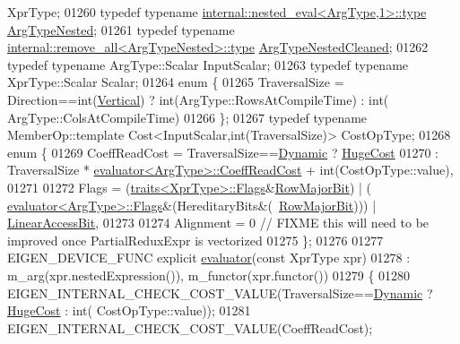 \begin{DoxyCode}
      XprType;
01260   \textcolor{keyword}{typedef} \textcolor{keyword}{typename} \hyperlink{class_eigen_1_1internal_1_1_tensor_lazy_evaluator_writable}{internal::nested\_eval<ArgType,1>::type} 
      \hyperlink{class_eigen_1_1internal_1_1_tensor_lazy_evaluator_writable}{ArgTypeNested};
01261   \textcolor{keyword}{typedef} \textcolor{keyword}{typename} \hyperlink{group___sparse_core___module}{internal::remove\_all<ArgTypeNested>::type} 
      \hyperlink{group___sparse_core___module}{ArgTypeNestedCleaned};
01262   \textcolor{keyword}{typedef} \textcolor{keyword}{typename} ArgType::Scalar InputScalar;
01263   \textcolor{keyword}{typedef} \textcolor{keyword}{typename} XprType::Scalar Scalar;
01264   \textcolor{keyword}{enum} \{
01265     TraversalSize = Direction==int(\hyperlink{group__enums_ggad49a7b3738e273eb00932271b36127f7addca718e0564723df21d61b94b1198be}{Vertical}) ? int(ArgType::RowsAtCompileTime) :  int(
      ArgType::ColsAtCompileTime)
01266   \};
01267   \textcolor{keyword}{typedef} \textcolor{keyword}{typename} MemberOp::template Cost<InputScalar,int(TraversalSize)> CostOpType;
01268   \textcolor{keyword}{enum} \{
01269     CoeffReadCost = TraversalSize==\hyperlink{namespace_eigen_ad81fa7195215a0ce30017dfac309f0b2}{Dynamic} ? \hyperlink{namespace_eigen_a3163430a1c13173faffde69016b48aaf}{HugeCost}
01270                   : TraversalSize * \hyperlink{struct_eigen_1_1internal_1_1evaluator}{evaluator<ArgType>::CoeffReadCost} + 
      int(CostOpType::value),
01271     
01272     Flags = (\hyperlink{struct_eigen_1_1internal_1_1traits}{traits<XprType>::Flags}&\hyperlink{group__flags_gae4f56c2a60bbe4bd2e44c5b19cbe8762}{RowMajorBit}) | (
      \hyperlink{struct_eigen_1_1internal_1_1evaluator}{evaluator<ArgType>::Flags}&(HereditaryBits&(~\hyperlink{group__flags_gae4f56c2a60bbe4bd2e44c5b19cbe8762}{RowMajorBit}))) | 
      \hyperlink{group__flags_ga4b983a15d57cd55806df618ac544d09e}{LinearAccessBit},
01273     
01274     Alignment = 0 \textcolor{comment}{// FIXME this will need to be improved once PartialReduxExpr is vectorized}
01275   \};
01276 
01277   EIGEN\_DEVICE\_FUNC \textcolor{keyword}{explicit} \hyperlink{struct_eigen_1_1internal_1_1evaluator}{evaluator}(\textcolor{keyword}{const} XprType xpr)
01278     : m\_arg(xpr.nestedExpression()), m\_functor(xpr.functor())
01279   \{
01280     EIGEN\_INTERNAL\_CHECK\_COST\_VALUE(TraversalSize==\hyperlink{namespace_eigen_ad81fa7195215a0ce30017dfac309f0b2}{Dynamic} ? \hyperlink{namespace_eigen_a3163430a1c13173faffde69016b48aaf}{HugeCost} : \textcolor{keywordtype}{int}(
      CostOpType::value));
01281     EIGEN\_INTERNAL\_CHECK\_COST\_VALUE(CoeffReadCost);

\end{DoxyCode}
